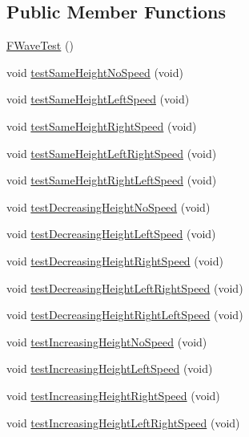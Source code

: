 \subsection*{Public Member Functions}
\begin{DoxyCompactItemize}
\item 
\hyperlink{classFWaveTest_a637e3a21850ed7432394b19d1f8320d1}{F\+Wave\+Test} ()
\item 
void \hyperlink{classFWaveTest_aad1779e385672a5fcea0fb09cbd8a2f0}{test\+Same\+Height\+No\+Speed} (void)
\item 
void \hyperlink{classFWaveTest_aed2db9d70b98e7b7924fcb8705bbf509}{test\+Same\+Height\+Left\+Speed} (void)
\item 
void \hyperlink{classFWaveTest_a4cffba9a84aeb963b6b8d4ac79efe227}{test\+Same\+Height\+Right\+Speed} (void)
\item 
void \hyperlink{classFWaveTest_a284fbedaff0f4e2a98ec868926176773}{test\+Same\+Height\+Left\+Right\+Speed} (void)
\item 
void \hyperlink{classFWaveTest_a5ceb6cf106458f0a0110ac13fe2c3f35}{test\+Same\+Height\+Right\+Left\+Speed} (void)
\item 
void \hyperlink{classFWaveTest_abf28f88dc07c66d8ccd7541a2fc9b901}{test\+Decreasing\+Height\+No\+Speed} (void)
\item 
void \hyperlink{classFWaveTest_a817892593d58cf1dad61a2abb0810378}{test\+Decreasing\+Height\+Left\+Speed} (void)
\item 
void \hyperlink{classFWaveTest_aaae1f57e2ef62d53bff1169d84aa7059}{test\+Decreasing\+Height\+Right\+Speed} (void)
\item 
void \hyperlink{classFWaveTest_a2dc496f15de60f5d199d6b1a35b596f3}{test\+Decreasing\+Height\+Left\+Right\+Speed} (void)
\item 
void \hyperlink{classFWaveTest_a24b35d3400c5ee91be94bf7ba47e82bf}{test\+Decreasing\+Height\+Right\+Left\+Speed} (void)
\item 
void \hyperlink{classFWaveTest_abd75e73da77f86f5145dd9ed1796f0fc}{test\+Increasing\+Height\+No\+Speed} (void)
\item 
void \hyperlink{classFWaveTest_aa6a036225ee4f6a00d40ba439899933d}{test\+Increasing\+Height\+Left\+Speed} (void)
\item 
void \hyperlink{classFWaveTest_a3e4e03f910ee006e0dce95cb2276a76a}{test\+Increasing\+Height\+Right\+Speed} (void)
\item 
void \hyperlink{classFWaveTest_a57b9d687f5a7311739883c9931d1e301}{test\+Increasing\+Height\+Left\+Right\+Speed} (void)

\end{DoxyCompactItemize}
